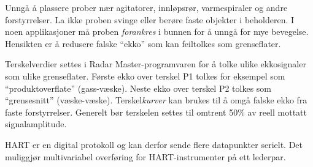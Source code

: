 












Unngå å plassere prober nær agitatorer, innløpsrør, varmespiraler og andre forstyrrelser. La ikke proben svinge eller berøre faste objekter i beholderen. I noen applikasjoner må proben {\it forankres} i bunnen for å unngå for mye bevegelse. Hensikten er å redusere falske ``ekko'' som kan feiltolkes som grenseflater.

\vskip 10pt

Terskelverdier settes i Radar Master-programvaren for å tolke ulike ekkosignaler som ulike grenseflater. Første ekko over terskel P1 tolkes for eksempel som ``produktoverflate'' (gass-væske). Neste ekko over terskel P2 tolkes som ``grensesnitt'' (væske-væske). Terskel{\it kurver} kan brukes til å omgå falske ekko fra faste forstyrrelser. Generelt bør terskelen settes til omtrent 50\% av reell mottatt signalamplitude.

\vskip 10pt

HART er en digital protokoll og kan derfor sende flere datapunkter serielt. Det muliggjør multivariabel overføring for HART-instrumenter på ett lederpar.



